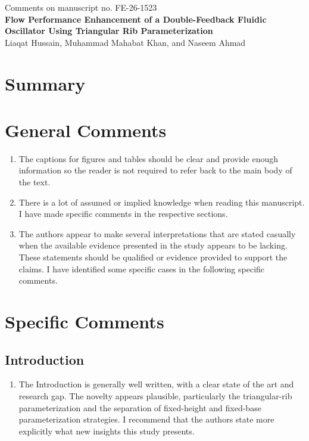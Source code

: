 \documentclass[11pt]{article}
\begin{document}
	
	\begin{center}
		Comments on manuscript no. FE-26-1523\\[0.75em]
		
		{\large \textbf{Flow Performance Enhancement of a Double-Feedback Fluidic Oscillator Using Triangular Rib Parameterization}}\\[0.5em]
		
		Liaqat Hussain, Muhammad Mahabat Khan, and Naseem Ahmad
	\end{center}
	
	\section*{Summary}
	
	\section*{General Comments}
	
	\begin{enumerate}
		\item The captions for figures and tables should be clear and provide enough information so the reader is not required to refer back to the main body of the text.
		\item There is a lot of assumed or implied knowledge when reading this manuscript. I have made specific comments in the respective sections.
		\item The authors appear to make several interpretations that are stated casually when the available evidence presented in the study appears to be lacking. These statements should be qualified or evidence provided to support the claims. I have identified some specific cases in the following specific comments.
	\end{enumerate}
	
	
	\section*{Specific Comments}
	
	\subsection*{Introduction}
	
	\begin{enumerate}
		\item The Introduction is generally well written, with a clear state of the art and research gap. The novelty appears plausible, particularly the triangular-rib parameterization and the separation of fixed-height and fixed-base parameterization strategies. I recommend that the authors state more explicitly what new insights this study presents.
	\end{enumerate}
	
\end{document}
